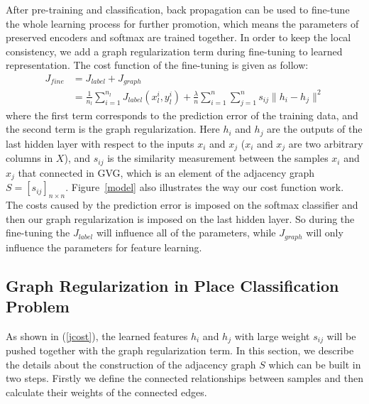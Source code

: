 \documentclass[letterpaper, 10 pt, conference]{ieeeconf}  %
\begin{document}
After pre-training and classification, back propagation can be used to fine-tune the whole learning process for further promotion, which means the parameters of preserved encoders and softmax are trained together. In order to keep the local consistency, we add a graph regularization term during fine-tuning to learned representation. The cost function of the fine-tuning is given as follow:
\begin{equation}\label{jcost}
\begin{split}
    J_{fine} &= J_{label}+ J_{graph}\\
      &= \frac{1}{n_l}\sum_{i=1}^{n_l}{J_{label}(x_l^i,y_l^i)} + \frac{\lambda}{n}\sum_{i=1}^{n}\sum_{j=1}^{n}{s_{ij}\|h_i-h_j\|^2}
\end{split}
\end{equation}
where the first term corresponds to the prediction error of the training data, and the second term is the graph regularization. Here $h_i$ and $h_j$ are the outputs of the last hidden layer with respect to the inputs $x_i$ and $x_j$ ($x_i$ and $x_j$ are two arbitrary columns in $X$), and  $s_{ij}$ is the similarity measurement between the samples $x_i$ and $x_j$ that connected in GVG, which is an element of the adjacency graph $S=[s_{ij}]_{n\times n}$. Figure~\ref{model} also illustrates the way our cost function work. The costs caused by the prediction error is imposed on the softmax classifier and then our graph regularization is imposed on the last hidden layer. So during the fine-tuning the $J_{label}$ will influence all of the parameters, while $J_{graph}$ will only influence the parameters for feature learning.


\subsection{Graph Regularization in Place Classification Problem}

As shown in (\ref{jcost}), the learned features $h_i$ and $h_j$ with large weight $s_{ij}$ will be pushed together with the graph regularization term. In this section, we describe the details about the construction of the adjacency graph $S$ which can be built in two steps. Firstly we define the connected relationships between samples and then calculate their weights of the connected edges.
\end{document}
